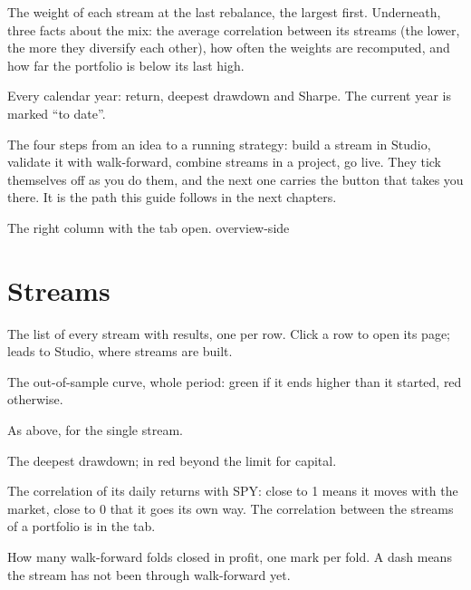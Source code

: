 \begin{description}[leftmargin = 1.4em, style = nextline, itemsep = 4pt]
  \item[Allocation] The weight of each stream at the last rebalance, the
    largest first. Underneath, three facts about the mix: the average
    correlation between its streams (the lower, the more they diversify each
    other), how often the weights are recomputed, and how far the portfolio
    is below its last high.
  \item[Yearly] Every calendar year: return, deepest drawdown and Sharpe.
    The current year is marked \enquote{to date}.
  \item[Next steps] The four steps from an idea to a running strategy: build
    a stream in Studio, validate it with walk-forward, combine streams in a
    project, go live. They tick themselves off as you do them, and the next
    one carries the button that takes you there. It is the path this guide
    follows in the next chapters.
\end{description}

  {The right column with the  tab open.}
  {overview-side}

\section{Streams}\label{sez:overview-list}

The list of every stream with results, one per row. Click a row to open its
page;  leads to Studio, where streams are built.

\begin{description}[leftmargin = 1.4em, style = nextline, itemsep = 4pt]
  \item[\voce{Equity}] The out-of-sample curve, whole period: green if it
    ends higher than it started, red otherwise.
  \item[\voce{Sharpe}, \voce{CAGR}] As above, for the single stream.
  \item[\voce{Max DD}] The deepest drawdown; in red beyond the 
    limit for capital.
  \item[\voce{SPY corr.}] The correlation of its daily returns with SPY:
    close to 1 means it moves with the market, close to 0 that it goes its
    own way. The correlation between the streams of a portfolio is in the
     tab.
  \item[\voce{Walk-forward}] How many walk-forward folds closed in profit,
    one mark per fold. A dash means the stream has not been through
    walk-forward yet.
\end{description}


